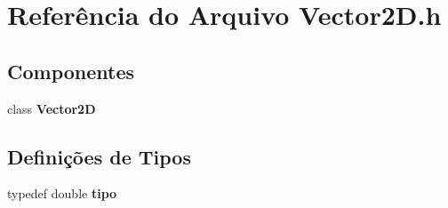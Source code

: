 \section{Referência do Arquivo Vector2\+D.\+h}
\label{_vector2_d_8h}
\subsection*{Componentes}
\begin{DoxyCompactItemize}
\item 
class {\bf Vector2D}
\end{DoxyCompactItemize}
\subsection*{Definições de Tipos}
\begin{DoxyCompactItemize}
\item 
typedef double {\bf tipo}
\end{DoxyCompactItemize}
